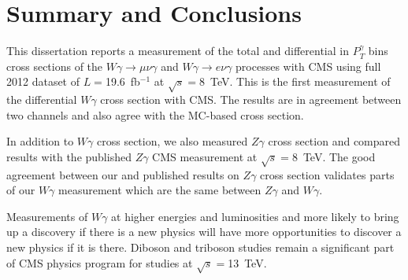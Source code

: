\chapter{Summary and Conclusions}
\label{sec:Conclusions}

This dissertation reports a measurement of the total and differential in $P_T^{\gamma}$ bins cross sections of the $W\gamma\rightarrow\mu\nu\gamma$ and $W\gamma\rightarrow e\nu\gamma$ processes with CMS using full 2012 dataset of $L=$19.6~fb$^{-1}$ at $\sqrt{s}=$8~TeV. This is the first measurement of the differential $W\gamma$ cross section with CMS. The results are in agreement between two channels and also agree with the MC-based cross section.

In addition to $W\gamma$ cross section, we also measured $Z\gamma$ cross section and compared results with the published $Z\gamma$ CMS measurement at $\sqrt{s}=$8~TeV. The good agreement between our and published results on $Z\gamma$ cross section validates parts of our $W\gamma$ measurement which are the same between $Z\gamma$ and $W\gamma$.

Measurements of $W\gamma$ at higher energies and luminosities and more likely to bring up a discovery if there is a new physics will have more opportunities to discover a new physics if it is there. Diboson and triboson studies remain a significant part of CMS physics program for studies at $\sqrt{s}=$13~TeV.

